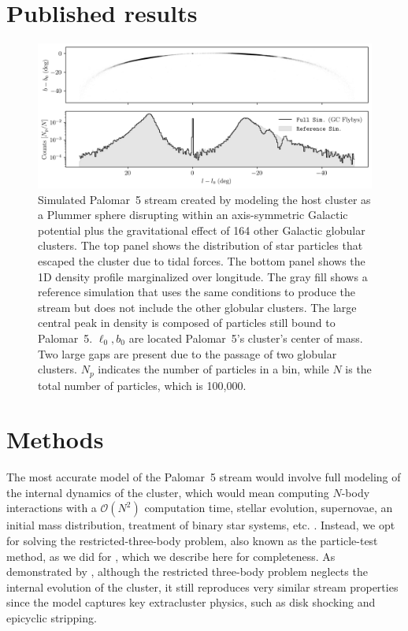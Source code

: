 \section{Published results}

  \begin{figure}
    \centering
    \includegraphics[width=\linewidth]{images/stream_on_sky_Pal5_monte-carlo-009_pouliasis2017pii-GCNBody_pouliasis2017pii.png}
    \caption{Simulated Palomar~5 stream created by modeling the host cluster as a Plummer sphere disrupting within an axis-symmetric Galactic potential plus the gravitational effect of 164 other Galactic globular clusters. The top panel shows the distribution of star particles that escaped the cluster due to tidal forces. The bottom panel shows the 1D density profile marginalized over longitude. The gray fill shows a reference simulation that uses the same conditions to produce the stream but does not include the other globular clusters. The large central peak in density is composed of particles still bound to Palomar~5. $\ell_0,b_0$ are located Palomar~5's cluster's center of mass. Two large gaps are present due to the passage of two globular clusters. $N_p$ indicates the number of particles in a bin, while $N$ is the total number of particles, which is 100,000.}
    \label{fig:stream_on_sky}
    \end{figure}

\section{Methods}
    The most accurate model of the Palomar~5 stream would involve full modeling of the internal dynamics of the cluster, which would mean computing $N$-body interactions with a $\mathcal{O}(N^2)$ computation time, stellar evolution, supernovae, an initial mass distribution, treatment of binary star systems, etc. \citep[for such an example, see][]{2021NatAs...5..957G, 2016MNRAS.458.1450W}. Instead, we opt for solving the restricted-three-body problem, also known as the particle-test method, as we did for \citet{2023A&A...673A..44F}, which we describe here for completeness. As demonstrated by \citet{2012A&A...546L...7M}, although the restricted three-body problem neglects the internal evolution of the cluster, it still reproduces very similar stream properties since the model captures key extracluster physics, such as disk shocking and epicyclic stripping.\\

